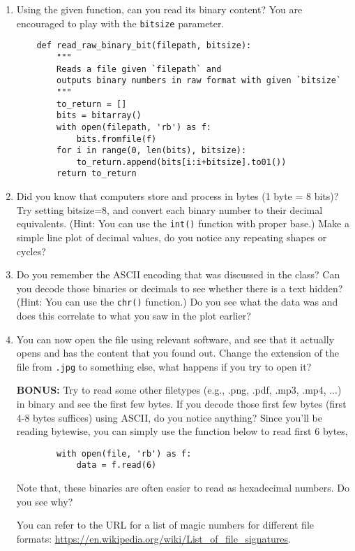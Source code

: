 \documentclass[12pt]{article}
\begin{document}
\begin{enumerate}
    \item Using the given function, can you read its binary content? You are encouraged to play with the \texttt{bitsize} parameter.

    \begin{verbatim}
    def read_raw_binary_bit(filepath, bitsize):
        """
        Reads a file given `filepath` and
        outputs binary numbers in raw format with given `bitsize`
        """
        to_return = []
        bits = bitarray()
        with open(filepath, 'rb') as f:
            bits.fromfile(f)
        for i in range(0, len(bits), bitsize):
            to_return.append(bits[i:i+bitsize].to01())
        return to_return
    \end{verbatim}

    \item Did you know that computers store and process in bytes (1 byte = 8 bits)? Try setting bitsize=8, and convert each binary number to their decimal equivalents. (Hint: You can use the \texttt{int()} function with proper base.) Make a simple line plot of decimal values, do you notice any repeating shapes or cycles?

    \item Do you remember the ASCII encoding that was discussed in the class? Can you decode those binaries or decimals to see whether there is a text hidden? (Hint: You can use the \texttt{chr()} function.) Do you see what the data was and does this correlate to what you saw in the plot earlier?

    \item You can now open the file using relevant software, and see that it actually opens and has the content that you found out. Change the extension of the file from \texttt{.jpg} to something else, what happens if you try to open it?

    \item [\textbf{BONUS:}] Try to read some other filetypes (e.g., .png, .pdf, .mp3, .mp4, ...) in binary and see the first few bytes. If you decode those first few bytes (first 4-8 bytes suffices) using ASCII, do you notice anything? Since you'll be reading bytewise, you can simply use the function below to read first 6 bytes,
    \begin{verbatim}
        with open(file, 'rb') as f:
            data = f.read(6)
    \end{verbatim}
    Note that, these binaries are often easier to read as hexadecimal numbers. Do you see why?

    You can refer to the URL for a list of magic numbers for different file formats: \url{https://en.wikipedia.org/wiki/List_of_file_signatures}.
\end{enumerate}
\end{document}
